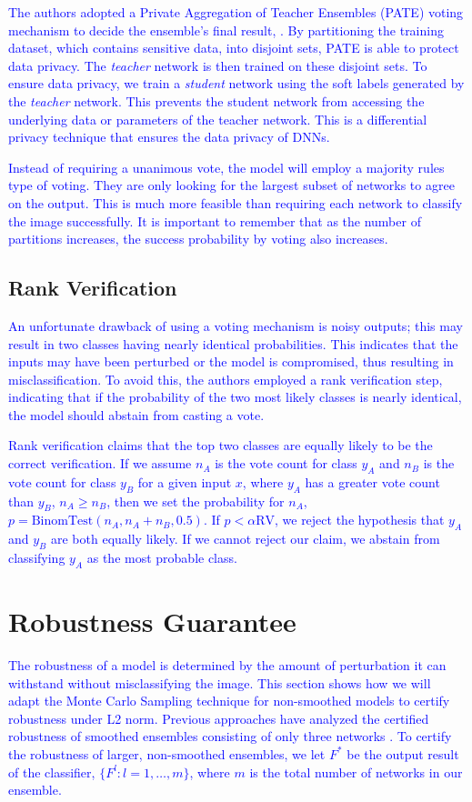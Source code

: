 \documentclass{article}
\begin{document}
\textcolor{blue}{
The authors adopted a Private Aggregation of Teacher Ensembles (PATE) voting mechanism to decide the ensemble's final result, \cite{reference12}. By partitioning the training dataset, which contains sensitive data, into disjoint sets, PATE is able to protect data privacy. The \textit{teacher }network is then trained on these disjoint sets. To ensure data privacy, we train a \textit{student }network using the soft labels generated by the \textit{teacher }network. This prevents the student network from accessing the underlying data or parameters of the teacher network. This is a differential privacy technique that ensures the data privacy of DNNs.}

\textcolor{blue}{
Instead of requiring a unanimous vote, the model will employ a majority rules type of voting. They are only looking for the largest subset of networks to agree on the output. This is much more feasible than requiring each network to classify the image successfully. It is important to remember that as the number of partitions increases, the success probability by voting also increases.}

\subsection{Rank Verification}
\textcolor{blue}{
An unfortunate drawback of using a voting mechanism is noisy outputs; this may result in two classes having nearly identical probabilities. This indicates that the inputs may have been perturbed or the model is compromised, thus resulting in misclassification. To avoid this, the authors employed a rank verification step, indicating that if the probability of the two most likely classes is nearly identical, the model should abstain from casting a vote.}

\textcolor{blue}{
Rank verification claims that the top two classes are equally likely to be the correct verification. If we assume \(n_A\) is the vote count for class \(y_A\) and \(n_B\) is the vote count for class \(y_B\) for a given input \(x\), where \(y_A\) has a greater vote count than \(y_B\), \(n_A \geq n_B\), then we set the probability for \(n_A\), \(p = \text{BinomTest}(n_A, n_A + n_B, 0.5)\). If \(p < \alpha\text{RV}\), we reject the hypothesis that \(y_A\) and \(y_B\) are both equally likely. If we cannot reject our claim, we abstain from classifying \(y_A\) as the most probable class.}

\section{Robustness Guarantee}
\textcolor{blue}{
The robustness of a model is determined by the amount of perturbation it can withstand without misclassifying the image. This section shows how we will adapt the Monte Carlo Sampling technique for non-smoothed models to certify robustness under L2 norm. Previous approaches have analyzed the certified robustness of smoothed ensembles consisting of only three networks \cite{reference1}. To certify the robustness of larger, non-smoothed ensembles, we let \( F^* \) be the output result of the classifier, \( \{ F^l: l = 1, \ldots, m \} \), where \( m \) is the total number of networks in our ensemble.}
\end{document}
